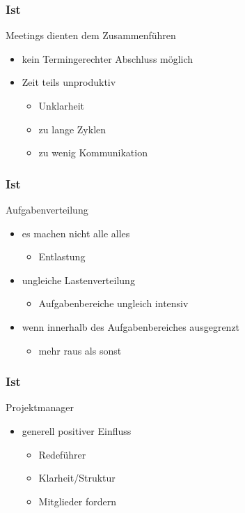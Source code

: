 \documentclass{beamer}
\begin{document}
\begin{frame}
\frametitle{Ist}
Meetings dienten dem Zusammenführen
  \begin{itemize}
    \item kein Termingerechter Abschluss möglich
    \item Zeit teils unproduktiv
      \begin{itemize}
        \item Unklarheit
        \item zu lange Zyklen
        \item zu wenig Kommunikation
      \end{itemize}

  \end{itemize}

\end{frame}

\begin{frame}
\frametitle{Ist}
Aufgabenverteilung
  \begin{itemize}
    \item es machen nicht alle alles
      \begin{itemize}
        \item Entlastung
      \end{itemize}
    \item ungleiche Lastenverteilung
      \begin{itemize}
        \item Aufgabenbereiche ungleich intensiv
      \end{itemize}
    \item  wenn innerhalb des Aufgabenbereiches ausgegrenzt
      \begin{itemize}
        \item  mehr raus als sonst
      \end{itemize}

  \end{itemize}

\end{frame}

\begin{frame}
\frametitle{Ist}
Projektmanager
  \begin{itemize}
    \item generell positiver Einfluss
      \begin{itemize}
        \item  Redeführer
        \item  Klarheit/Struktur
        \item  Mitglieder fordern
      \end{itemize}
  \end{itemize}
\end{frame}



\end{document}
